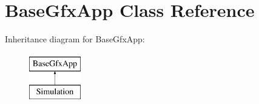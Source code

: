 \hypertarget{classBaseGfxApp}{\section{Base\-Gfx\-App Class Reference}
\label{classBaseGfxApp}
}
Inheritance diagram for Base\-Gfx\-App\-:\begin{figure}[H]
\begin{center}
\leavevmode
\includegraphics[height=2.000000cm]{classBaseGfxApp}
\end{center}
\end{figure}
